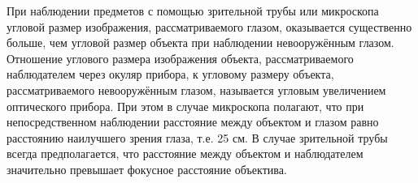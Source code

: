 При наблюдении предметов с помощью зрительной трубы или микроскопа угловой размер 
изображения, рассматриваемого глазом, оказывается существенно больше, чем угловой размер 
объекта при наблюдении невооружённым глазом. Отношение углового размера изображения 
объекта, рассматриваемого наблюдателем через окуляр прибора, к угловому размеру объекта, 
рассматриваемого невооружённым глазом, называется угловым увеличением оптического прибора. 
При этом в случае микроскопа полагают, что при непосредственном наблюдении расстояние 
между объектом и глазом равно расстоянию наилучшего зрения глаза, т.е. 25 см. В случае 
зрительной трубы всегда предполагается, что расстояние между объектом и наблюдателем 
значительно превышает фокусное расстояние объектива.